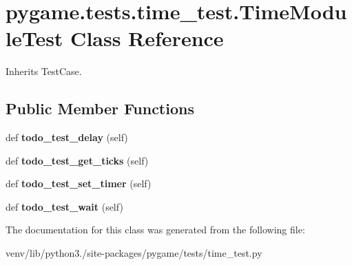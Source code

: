 \hypertarget{classpygame_1_1tests_1_1time__test_1_1_time_module_test}{}\section{pygame.\+tests.\+time\+\_\+test.\+Time\+Module\+Test Class Reference}
\label{classpygame_1_1tests_1_1time__test_1_1_time_module_test}


Inherits Test\+Case.

\subsection*{Public Member Functions}
\begin{DoxyCompactItemize}
\item 
\mbox{\label{classpygame_1_1tests_1_1time__test_1_1_time_module_test_aa12dd7fa112ecf0f0701452dd02e6b42}} 
def {\bfseries todo\+\_\+test\+\_\+delay} (self)
\item 
\mbox{\label{classpygame_1_1tests_1_1time__test_1_1_time_module_test_a40f114d4075e9a006badde50a1052052}} 
def {\bfseries todo\+\_\+test\+\_\+get\+\_\+ticks} (self)
\item 
\mbox{\label{classpygame_1_1tests_1_1time__test_1_1_time_module_test_afb303bdcf5fc4e3dff172ebb7c4cc692}} 
def {\bfseries todo\+\_\+test\+\_\+set\+\_\+timer} (self)
\item 
\mbox{\label{classpygame_1_1tests_1_1time__test_1_1_time_module_test_a9a79606ebbbb8f0b612ec1cc7cd59158}} 
def {\bfseries todo\+\_\+test\+\_\+wait} (self)
\end{DoxyCompactItemize}


The documentation for this class was generated from the following file\+:\begin{DoxyCompactItemize}
\item 
venv/lib/python3./site-\/packages/pygame/tests/time\+\_\+test.\+py\end{DoxyCompactItemize}
